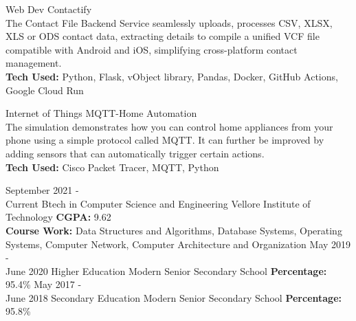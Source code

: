 \documentclass[9pt]{developercv}
\begin{document}
\begin{entrylist}
    \entry
		{Web Dev}
		{Contactify}
		{\\}
		{The Contact File Backend Service seamlessly uploads, processes CSV, XLSX, XLS or ODS contact data,   extracting
details to compile a unified VCF file compatible with Android and iOS, simplifying cross-platform contact management.\\
        \textbf{Tech Used: } Python, Flask, vObject library, Pandas, Docker, GitHub Actions, Google Cloud Run
        }

    \entry
		{Internet of Things}
		{MQTT-Home Automation}
		{\\}
		{The simulation demonstrates how you can control home appliances from your phone using a simple protocol called MQTT. It can further be improved by adding sensors that can automatically trigger certain actions.\\
        \textbf{Tech Used: } Cisco Packet Tracer, MQTT, Python
        }
        
\end{entrylist}

\vspace{-10 pt}
\begin{entrylist}
    \entry
		{September 2021 - \\ Current}
		{Btech in Computer Science and Engineering}
		{Vellore Institute of Technology}
		{\textbf{CGPA: }9.62\\
        \textbf{Course Work: }Data Structures and Algorithms, Database Systems, Operating Systems, Computer Network, Computer
Architecture and Organization
  }
    \entry
		{May 2019 - \\ June 2020}
		{Higher Education}
		{Modern Senior Secondary School}
		{\textbf{Percentage: }95.4\%}
    \entry
		{May 2017 - \\ June 2018}
		{Secondary Education}
		{Modern Senior Secondary School}
		{\textbf{Percentage: }95.8\%}
\end{entrylist}
\end{document}
